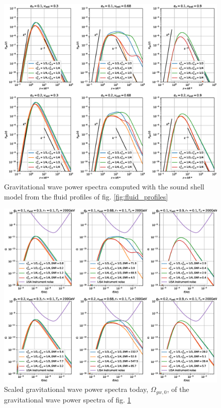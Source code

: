 \begin{figure}[ht!]
\centering
\includegraphics[width=\textwidth]{msc2-python/fig/const_cs_gw.eps}
\caption{Gravitational wave power spectra computed with the sound shell model from the fluid profiles of fig. \ref{fig:fluid_profiles}}
\label{fig:gw_spectra}
\end{figure}

\begin{figure}[ht!]
\centering
\includegraphics[width=\textwidth]{msc2-python/fig/const_cs_gw_omgw0.eps}
\caption{Scaled gravitational wave power spectra today, $\Omega_{gw,0}$, of the gravitational wave power spectra of fig. \ref{fig:gw_spectra}}
\label{fig:omgw0}
\end{figure}

